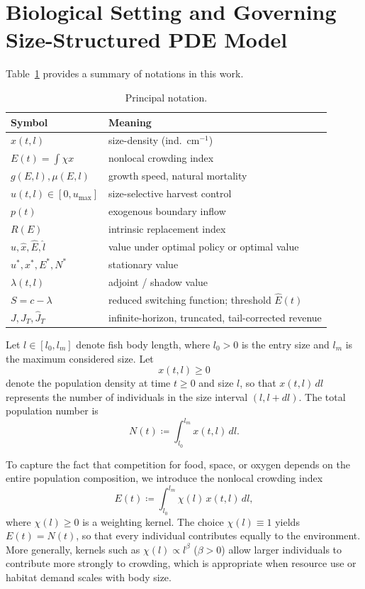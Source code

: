 \documentclass[pdflatex,sn-mathphys-num]{sn-jnl}
\theoremstyle{thmstyleone}
\theoremstyle{definition}
\theoremstyle{remark}
\begin{document}
\section{Biological Setting and Governing Size-Structured PDE Model}\label{sec:model}

Table~\ref{tab:notation} provides a summary of notations in this work. 
\begin{table}[h]\centering
\caption{Principal notation.}\label{tab:notation}
\begin{tabular}{ll}
\toprule
Symbol & Meaning\\
\midrule
$x(t,l)$ & size-density (ind.\ cm$^{-1}$)\\
$E(t)=\int\chi x$ & nonlocal crowding index\\
$g(E,l),\mu(E,l)$ & growth speed, natural mortality\\
$u(t,l)\in[0,u_{\max}]$ & size-selective harvest control\\
$p(t)$ & exogenous boundary inflow\\
$R(E)$ & intrinsic replacement index\\
$\hat u,\hat x, \hat E, \hat l$ & value under optimal policy or optimal value \\
$u^*, x^*,E^*, N^*$ & stationary value\\
$\lambda(t,l)$ & adjoint / shadow value\\
$S=c-\lambda$ & reduced switching function; threshold $\hat E(t)$\\
$J,J_T,\widehat J_T$ & infinite-horizon, truncated, tail-corrected revenue\\
\bottomrule
\end{tabular}
\end{table}

Let $l\in[l_0,l_m]$ denote fish body length, where $l_0>0$ is the entry size and $l_m$ is the maximum considered size. Let
\[
x(t,l)\ge 0
\]
denote the population density at time $t\ge 0$ and size $l$, 
so that
$x(t,l)\,dl$ represents the number of individuals in the size interval
$(l,l+dl)$. The total population number is
\begin{equation}\label{eq:totalN}
N(t)\coloneqq \int_{l_0}^{l_m} x(t,l)\,dl.
\end{equation}

To capture the fact that competition for food, space, or oxygen depends on the
entire population composition, we introduce the nonlocal crowding index
\begin{equation}\label{eq:Edef}
E(t)\coloneqq \int_{l_0}^{l_m}\chi(l)\,x(t,l)\,dl,
\end{equation}
where $\chi(l)\ge 0$ is a weighting kernel. The choice $\chi(l)\equiv 1$
yields $E(t)=N(t)$, 
so that every individual contributes equally to the
environment. More generally, kernels such as $\chi(l)\propto l^\beta$ ($\beta>0$) allow
larger individuals to contribute more strongly to crowding, which is
appropriate when resource use or habitat demand scales with body size.
\end{document}
